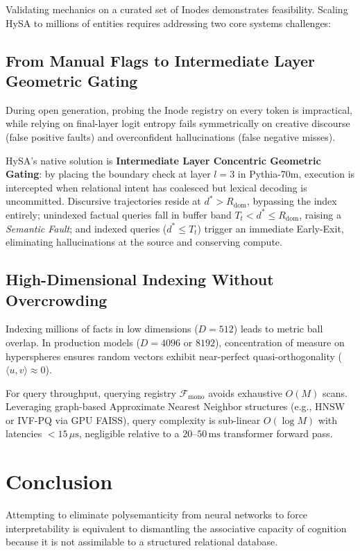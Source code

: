 \documentclass[11pt,a4paper]{article}
\theoremstyle{definition}
\begin{document}
Validating mechanics on a curated set of Inodes demonstrates feasibility. Scaling HySA to millions of entities requires addressing two core systems challenges:

\subsection{From Manual Flags to Intermediate Layer Geometric Gating}

During open generation, probing the Inode registry on every token is impractical, while relying on final-layer logit entropy fails symmetrically on creative discourse (false positive faults) and overconfident hallucinations (false negative misses).

HySA's native solution is \textbf{Intermediate Layer Concentric Geometric Gating}: by placing the boundary check at layer $l=3$ in Pythia-70m, execution is intercepted when relational intent has coalesced but lexical decoding is uncommitted. Discursive trajectories reside at $d^* > R_{\mathrm{dom}}$, bypassing the index entirely; unindexed factual queries fall in buffer band $T_t < d^* \le R_{\mathrm{dom}}$, raising a \textit{Semantic Fault}; and indexed queries ($d^* \le T_t$) trigger an immediate Early-Exit, eliminating hallucinations at the source and conserving compute.

\subsection{High-Dimensional Indexing Without Overcrowding}

Indexing millions of facts in low dimensions ($D=512$) leads to metric ball overlap. In production models ($D = 4096$ or $8192$), concentration of measure on hyperspheres ensures random vectors exhibit near-perfect quasi-orthogonality ($\langle u, v \rangle \approx 0$).

For query throughput, querying registry $\mathcal{F}_{\mathrm{mono}}$ avoids exhaustive $O(M)$ scans. Leveraging graph-based Approximate Nearest Neighbor structures (e.g., HNSW or IVF-PQ via GPU FAISS), query complexity is sub-linear $O(\log M)$ with latencies $<15\,\mu\text{s}$, negligible relative to a $20\text{--}50\,\text{ms}$ transformer forward pass.

\section{Conclusion}

Attempting to eliminate polysemanticity from neural networks to force interpretability is equivalent to dismantling the associative capacity of cognition because it is not assimilable to a structured relational database.
\end{document}
